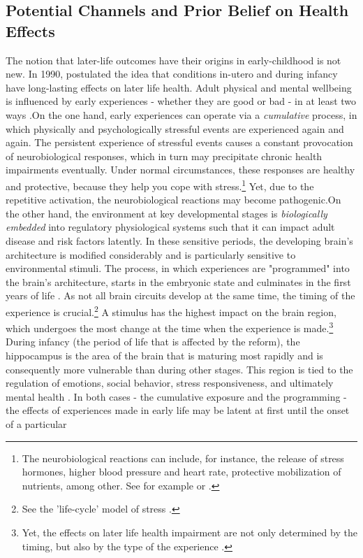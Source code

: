 \documentclass[11pt, a4paper,draft]{article} %
\begin{document}
 





\subsection[Channels]{Potential Channels and Prior Belief on Health Effects}
The notion that later-life outcomes have their origins in early-childhood is not new. In 1990, \citeauthor{Barker1990origins} postulated the idea that conditions in-utero and during infancy have long-lasting effects on later life health. Adult physical and mental wellbeing is influenced by early experiences - whether they are good or bad - in at least two ways \citep{shonkoff2009neuroscience}.\newline On the one hand, early experiences can operate via a \emph{cumulative} process, in which physically and psychologically stressful events are experienced again and again. The persistent experience of stressful events causes a constant provocation of neurobiological responses, which in turn may precipitate chronic health impairments eventually. Under normal circumstances, these responses are healthy and protective, because they help you cope with stress.\footnote{The neurobiological reactions can include, for instance, the release of stress hormones, higher blood pressure and heart rate, protective mobilization of nutrients, among other. See for example \cite{mcewen1998stress} or \cite{shonkoff2009neuroscience}.} Yet, due to the repetitive activation, the neurobiological reactions may become pathogenic.\newline On the other hand, the environment at key developmental stages is \emph{biologically embedded} into regulatory physiological systems such that it can impact adult disease and risk factors latently. In these sensitive periods, the developing brain's architecture is modified considerably and is particularly sensitive to environmental stimuli. The process, in which experiences are "programmed" into the brain's architecture, starts in the embryonic state and culminates in the first years of life \citep{raikkonen2012early}. As not all brain circuits develop at the same time, the timing of the experience is crucial.\footnote{See the 'life-cycle' model of stress \citep{lupien2009effects}.} A stimulus has the highest impact on the brain region, which undergoes the most change at the time when the experience is made.\footnote{Yet, the effects on later life health impairment are not only determined by the timing, but also by the type of the experience \citep{raikkonen2012early}.} During infancy (the period of life that is affected by the reform), the hippocampus is the area of the brain that is maturing most rapidly and is consequently more vulnerable than during other stages. This region is tied to the regulation of emotions, social behavior, stress responsiveness, and ultimately mental health \citep{center2016best,shonkoff2009neuroscience}. \newline In both cases - the cumulative exposure and the programming - the effects of experiences made in early life may be latent at first until the onset of a particular 
\end{document}
